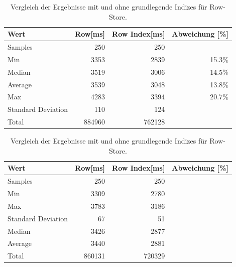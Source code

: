 \begin{table}[H]
    \begin{tabularx}{10cm}{lrrr}
        \toprule
        Wert                & Row[ms] & Row Index[ms]   & Abweichung [\%]\\
        \toprule
        Samples             & 250      & 250            &       \\
        Min                 & 3353     & 2839           &  15.3\%     \\
        Median              & 3519     & 3006           &  14.5\%     \\
        Average             & 3539     & 3048           &  13.8\%     \\
        Max                 & 4283     & 3394           &  20.7\%     \\
        Standard Deviation  & 110      & 124            &       \\
        Total               & 884960   & 762128         &       \\ 
        \bottomrule
    \end{tabularx}
\caption{Vergleich der Ergebnisse mit und ohne grundlegende Indizes für Row-Store.}
\label{tab:basic_index_row}
\end{table}





\begin{table}[H]
    \begin{tabularx}{10cm}{lrrr}
        \toprule
        Wert                & Row[ms] & Row Index[ms]   & Abweichung [\%]\\
        \toprule
        Samples             & 250     &  250            &       \\
        \midrule
        Min                 & 3309    &  2780           &       \\
        Max                 & 3783    &  3186           &       \\
        Standard Deviation  & 67      &  51             &       \\
        \midrule
        Median              & 3426    &  2877           &       \\
        Average             & 3440    &  2881           &       \\
        \midrule
        Total               & 860131  &  720329         &       \\
        \bottomrule
    \end{tabularx}
\caption{Vergleich der Ergebnisse mit und ohne grundlegende Indizes für Row-Store.}
\label{tab:basic_index_row}
\end{table}


